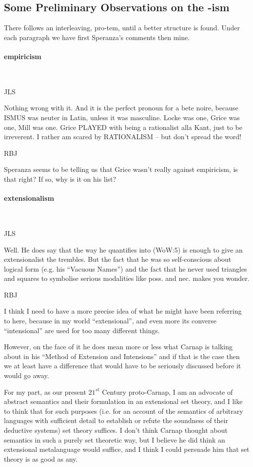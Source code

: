 \documentclass[10pt,titlepage]{book}
\begin{document}
 
\subsection{Some Preliminary Observations on the -ism}

There follows an interleaving, pro-tem, until a better structure is found.
Under each paragraph we have first Speranza's comments then mine.


\paragraph{empiricism}\ 

JLS

Nothing wrong with it. And it is the perfect pronoun for a bete 
 noire, because ISMUS was neuter in Latin, unless it was masculine. Locke 
was  one, Grice was one, Mill was one. Grice PLAYED with being a rationalist 
alla  Kant, just to be irreverent.
I rather am scared by RATIONALISM -- but 
don't  spread the word!
 
RBJ

Speranza seems to be telling us that Grice wasn't really against empiricism, is that right?
If so, why is it on his list?
 
\paragraph{extensionalism}\ 

JLS

Well. He does say that the way he quantifies into (WoW:5)  
is enough to give an extensionalist the trembles. But the fact that he was 
so  self-conscious about logical form (e.g. his ``Vacuous Names'') and the fact 
that  he never used triangles and squares to symbolise serious modalities 
like poss.  and nec. makes you wonder.

RBJ

I think I need to have a more precise idea of what he might have been referring to here, because in my world ``extensional'', and even more its converse ``intensional'' are used for too many different things.

However, on the face of it he does mean more or less what Carnap is talking about in his ``Method of Extension and Intensions'' and if that is the case then we at least have a difference that would have to be seriously discussed before it would go away.

For my part, as our present $21^{st}$ Century proto-Carnap, I am an advocate of abstract semantics and their formulation in an extensional set theory, and I like to think that for such purposes (i.e. for an account of the semantics of arbitrary languages with sufficient detail to establish or refute the soundness of their deductive systems) set theory suffices.
I don't think Carnap thought about semantics in such a purely set theoretic way, but I believe he did think an extensional metalanguage would suffice, and I think I could persuade him that set theory is as good as any.
\end{document}
